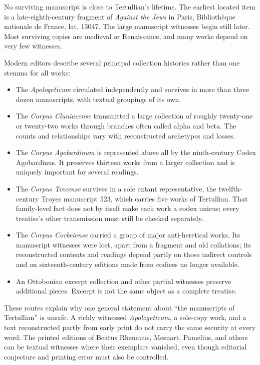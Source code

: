 No surviving manuscript is close to Tertullian's lifetime. The earliest located
item is a late-eighth-century fragment of \emph{Against the Jews} in Paris,
Biblioth\`eque nationale de France, lat. 13047. The large manuscript witnesses
begin still later. Most surviving copies are medieval or Renaissance, and many
works depend on very few witnesses.

Modern editors describe several principal collection histories rather than one
stemma for all works:

\begin{itemize}
\item The \emph{Apologeticum} circulated independently and survives in more
than three dozen manuscripts, with textual groupings of its own.
\item The \emph{Corpus Cluniacense} transmitted a large collection of roughly
twenty-one or twenty-two works through branches often called alpha and beta.
The counts and relationships vary with reconstructed archetypes and losses.
\item The \emph{Corpus Agobardinum} is represented above all by the
ninth-century Codex Agobardinus. It preserves thirteen works from a larger
collection and is uniquely important for several readings.
\item The \emph{Corpus Trecense} survives in a sole extant representative, the
twelfth-century Troyes manuscript 523, which carries five works of Tertullian.
That family-level fact does not by itself make each work a codex unicus; every
treatise's other transmission must still be checked separately.
\item The \emph{Corpus Corbeiense} carried a group of major anti-heretical
works. Its manuscript witnesses were lost, apart from a fragment and old
collations; its reconstructed contents and readings depend partly on those
indirect controls and on sixteenth-century editions made from codices no longer
available.
\item An Ottobonian excerpt collection and other partial witnesses preserve
additional pieces. Excerpt is not the same object as a complete treatise.
\end{itemize}

These routes explain why one general statement about ``the manuscripts of
Tertullian'' is unsafe. A richly witnessed \emph{Apologeticum}, a sole-copy
work, and a text reconstructed partly from early print do not carry the same
security at every word. The printed editions of Beatus Rhenanus, Mesnart,
Pamelius, and others can be textual witnesses where their exemplars vanished,
even though editorial conjecture and printing error must also be controlled.

